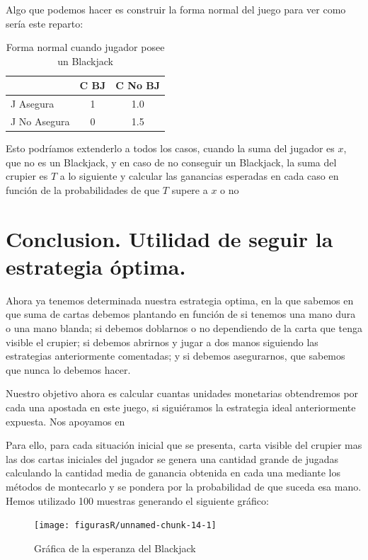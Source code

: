 \documentclass[12pt,a4paper,]{book}
\numberwithin{dummy}{section}
\theoremstyle{ocrenumbox}
\theoremstyle{blacknumex}
\theoremstyle{blacknumbox}
\theoremstyle{ocrenum}
\theoremstyle{ocrenum}
\begin{document}
Algo que podemos hacer es construir la forma normal del juego para ver
como sería este reparto:

\begingroup\fontsize{12}{14}\selectfont

\begin{longtable}[t]{lcc}
\caption{\label{tab:unnamed-chunk-12}Forma normal cuando jugador posee un Blackjack}\\
\toprule
 & C BJ & C No BJ\\
\midrule
J Asegura & 1 & 1.0\\
J No Asegura & 0 & 1.5\\
\bottomrule
\end{longtable}
\endgroup{}

Esto podríamos extenderlo a todos los casos, cuando la suma del jugador
es \(x\), que no es un Blackjack, y en caso de no conseguir un
Blackjack, la suma del crupier es \(T\) a lo siguiente y calcular las
ganancias esperadas en cada caso en función de la probabilidades de que
\(T\) supere a \(x\) o no

\hypertarget{Seccion46}{%
\section{Conclusion. Utilidad de seguir la estrategia
óptima.}\label{Seccion46}}

Ahora ya tenemos determinada nuestra estrategia optima, en la que
sabemos en que suma de cartas debemos plantando en función de si tenemos
una mano dura o una mano blanda; si debemos doblarnos o no dependiendo
de la carta que tenga visible el crupier; si debemos abrirnos y jugar a
dos manos siguiendo las estrategias anteriormente comentadas; y si
debemos asegurarnos, que sabemos que nunca lo debemos hacer.

Nuestro objetivo ahora es calcular cuantas unidades monetarias
obtendremos por cada una apostada en este juego, si siguiéramos la
estrategia ideal anteriormente expuesta. Nos apoyamos en \citep{Libro9}

Para ello, para cada situación inicial que se presenta, carta visible
del crupier mas las dos cartas iniciales del jugador se genera una
cantidad grande de jugadas calculando la cantidad media de ganancia
obtenida en cada una mediante los métodos de montecarlo y se pondera por
la probabilidad de que suceda esa mano. Hemos utilizado 100 muestras
generando el siguiente gráfico:

\begin{figure}[H]

{\centering \texttt{[image: figurasR/unnamed-chunk-14-1]} 

}

\caption{Gráfica de la esperanza del Blackjack \label{esperanza_blackjack}}\label{fig:unnamed-chunk-14}
\end{figure}
\end{document}
